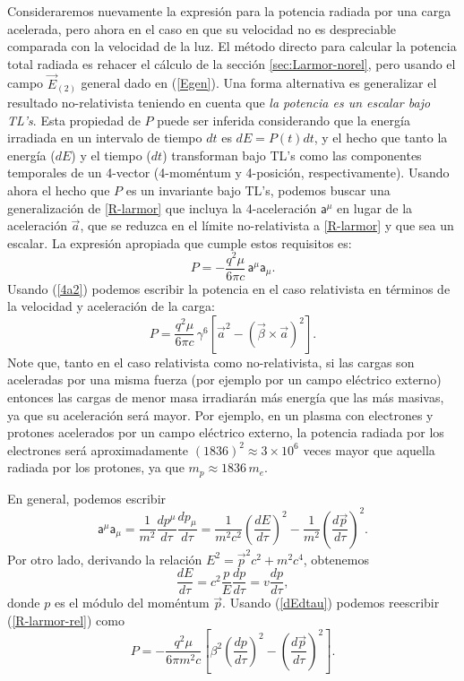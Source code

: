 Consideraremos nuevamente la expresión para la potencia radiada por una carga acelerada, pero ahora en el caso en que su velocidad no es despreciable comparada con la velocidad de la luz. El método directo para calcular la
potencia total radiada es rehacer el cálculo de la sección \ref{sec:Larmor-norel}, pero usando el campo $\vec{E}_{(2)}$ general dado en (\ref{Egen}). Una forma alternativa es generalizar el resultado no-relativista teniendo en cuenta que \textit{la potencia es un escalar bajo TL's}. Esta propiedad de $P$ puede ser inferida considerando que la energía irradiada en un intervalo de tiempo $dt$ es $dE=P(t)dt$, y el hecho que tanto la energía ($dE$) y el tiempo ($dt$) transforman bajo TL's como las componentes temporales de un 4-vector (4-moméntum y 4-posición, respectivamente). Usando ahora el hecho que $P$ es un invariante bajo TL's, podemos buscar una generalización de \eqref{R-larmor} que incluya la 4-aceleración $\mathsf{a}^\mu$ en lugar de la aceleración $\vec{a}$, que se reduzca en el límite no-relativista a \eqref{R-larmor} y que sea un escalar. La expresión apropiada que cumple estos requisitos es:
\begin{equation}
\boxed{P=-\frac{q^2\mu}{6\pi c}\,\mathsf{a}^\mu\mathsf{a}_\mu.}\label{R-larmor-rel}
\end{equation}
Usando (\ref{4a2}) podemos escribir la potencia en el caso
relativista en términos de la velocidad y aceleración de la carga:
\begin{equation}
\boxed{P=\frac{q^2\mu}{6\pi c}\,\gamma^6\left[ \vec{a}^2-\left(\vec{\beta}\times\vec{a}\right)^2\right] .}\label{R-larmor2}
\end{equation}
Note que, tanto en el caso relativista como no-relativista, si las cargas son
aceleradas por una misma fuerza (por ejemplo por un campo eléctrico externo)
entonces las cargas de menor masa irradiarán más energía que las más
masivas, ya que su aceleración será mayor. Por ejemplo, en un plasma con
electrones y protones acelerados por un campo eléctrico externo, la potencia
radiada por los electrones será aproximadamente $(1836)^2\approx 3\times
10^{6}$ veces mayor que aquella radiada por los protones, ya que $m_p\approx
1836\,m_e$.

En general, podemos escribir
\begin{equation}
\mathsf{a}^\mu\mathsf{a}_\mu=\frac{1}{m^2}\frac{dp^\mu}{d\tau}\frac{dp_\mu}{
d\tau}=\frac{1}{m^2c^2}\left( \frac{dE}{d\tau}\right)^2-\frac{1}{m^2}\left(
\frac{d\vec{p}}{d\tau}\right)^2.
\end{equation}
Por otro lado, derivando la relación $E^2=\vec{p}^2c^2+m^2c^4$, obtenemos
\begin{equation}
\frac{dE}{d\tau}=c^2\frac{p}{E}\frac{dp}{d\tau}=v\frac{dp}{d\tau},
\label{dEdtau}
\end{equation}
donde $p$ es el módulo del moméntum $\vec{p}$. Usando (\ref{dEdtau}) podemos
reescribir (\ref{R-larmor-rel}) como
\begin{equation}
P=-\frac{q^2\mu}{6\pi m^2c}\left[ \beta^2\left(
\frac{dp}{d\tau}\right)^2-\left( \frac{d\vec{p}}{d\tau}\right)^2\right] .
\label{4a2-2}
\end{equation}

